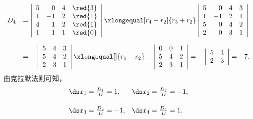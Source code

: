 \begin{frame}




$$
\begin{array}{rl}
  D_4 &= \left|
        \begin{array}{rrrr}
          5&0&4&\red{3}\\
          1&-1&2&\red{1}\\
          4&1&2&\red{1}\\
          1&1&1&\red{0}\\
        \end{array}
  \right|
  
  \xlongequal[r_4+r_2]{r_3+r_2}
  \left|
  \begin{array}{rrrrr}
    5&0&4&{3}\\
    1&-1&2&{1}\\
    5&0&4&{2}\\
    2&0&3&{1}\\
  \end{array}
  \right| \\[0.4in]
      & =  -   
        \left|
        \begin{array}{rrr}
          5&4&{3}\\
          5&4&{2}\\
          2&3&{1}\\
        \end{array}
  \right| 
  \xlongequal[]{r_1-r_2}
  -\left|
  \begin{array}{rrr}
    0&0&{1}\\
    5&4&{2}\\
    2&3&{1}\\
  \end{array}\right| 
  =
  -\left|
  \begin{array}{rrr}
    5&4\\
    2&3\\
  \end{array}\right|
  = -7.
\end{array}
$$ 
由克拉默法则可知，
$$
\begin{array}{lll}
  \ds x_1 = \frac{D_1}D = 1, &
                               \ds x_2 = \frac{D_2}D = -1, \\[0.2in]
  \ds x_3 = \frac{D_3}D = -1, &
                                \ds x_4 = \frac{D_4}D = 1.
\end{array}
$$

\end{frame}

